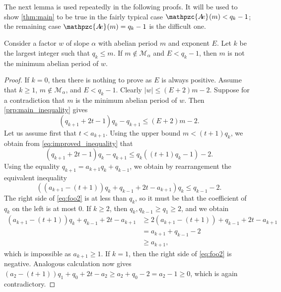 \documentclass[a4paper,fleqn]{article}
\providecommand{\abs}[1]{\lvert#1\rvert}
\newcommand{\abexp}[2][]{\mathpzc{A\mkern-3mu e}_{#1}(#2)}
\begin{document}
  The next lemma is used repeatedly in the following proofs. It will be used to show \autoref{thm:main} to be true in
  the fairly typical case $\abexp{m} < q_k - 1$; the remaining case $\abexp{m} = q_k - 1$ is the difficult one.

  \begin{lemma}\label{lem:improved_ub}
    Consider a factor $w$ of slope $\alpha$ with abelian period $m$ and exponent $E$. Let $k$ be the largest integer
    such that $q_k \leq m$. If $m \notin \mathcal{M}_\alpha$ and $E < q_k - 1$, then $m$ is not the minimum abelian
    period of $w$.
  \end{lemma}
  \begin{proof}
    If $k = 0$, then there is nothing to prove as $E$ is always positive. Assume that $k \geq 1$,
    $m \notin \mathcal{M}_\alpha$, and $E < q_k - 1$. Clearly $\abs{w} \leq (E + 2)m - 2$. Suppose for a contradiction
    that $m$ is the minimum abelian period of $w$. Then \autoref{prp:main_inequality} gives
    \begin{equation}\label{eq:improved_inequality}
      (q_{k+1} + 2t - 1)q_k - q_{k+1} \leq (E + 2)m - 2.
    \end{equation}
    Let us assume first that $t < a_{k+1}$. Using the upper bound $m < (t + 1)q_k$, we obtain from
    \eqref{eq:improved_inequality} that
    \begin{equation*}
      (q_{k+1} + 2t - 1)q_k - q_{k+1} \leq q_k((t + 1)q_k - 1) - 2.
    \end{equation*}
    Using the equality $q_{k+1} = a_{k+1}q_k + q_{k-1}$, we obtain by rearrangement the equivalent inequality
    \begin{equation}\label{eq:foo2}
      ((a_{k+1} - (t + 1))q_k + q_{k-1} + 2t - a_{k+1})q_k \leq q_{k-1} - 2.
    \end{equation}
    The right side of \eqref{eq:foo2} is at less than $q_k$, so it must be that the coefficient of $q_k$ on the left is
    at most $0$. If $k \geq 2$, then $q_k, q_{k-1} \geq q_1 \geq 2$, and we obtain
    \begin{align*}
      (a_{k+1} - (t + 1))q_k + q_{k-1} + 2t - a_{k+1} &\geq 2(a_{k+1} - (t + 1)) + q_{k-1} + 2t - a_{k+1} \\
                                                      &= a_{k+1} + q_{k-1} - 2 \\
                                                      &\geq a_{k+1},
    \end{align*}
    which is impossible as $a_{k+1} \geq 1$. If $k = 1$, then the right side of \eqref{eq:foo2} is negative. Analogous
    calculation now gives $(a_2 - (t + 1))q_1 + q_0 + 2t - a_2 \geq a_2 + q_0 - 2 = a_2 - 1 \geq 0$, which is again
    contradictory.
    

\end{proof}
\end{document}
